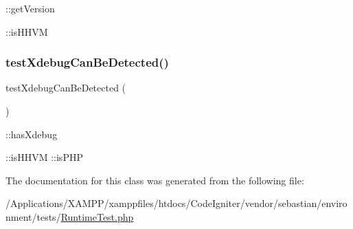 \+::get\+Version

\+::is\+H\+H\+VM \mbox{\label{class_sebastian_bergmann_1_1_environment_1_1_runtime_test_a322b0f14395333154f816a3d8a5d7b86}} 
\subsubsection{\texorpdfstring{test\+Xdebug\+Can\+Be\+Detected()}{testXdebugCanBeDetected()}}
{\footnotesize\ttfamily test\+Xdebug\+Can\+Be\+Detected (\begin{DoxyParamCaption}{ }\end{DoxyParamCaption})}

\+::has\+Xdebug

\+::is\+H\+H\+VM  \+::is\+P\+HP 

The documentation for this class was generated from the following file\+:\begin{DoxyCompactItemize}
\item 
/\+Applications/\+X\+A\+M\+P\+P/xamppfiles/htdocs/\+Code\+Igniter/vendor/sebastian/environment/tests/\mbox{\hyperlink{_runtime_test_8php}{Runtime\+Test.\+php}}\end{DoxyCompactItemize}

